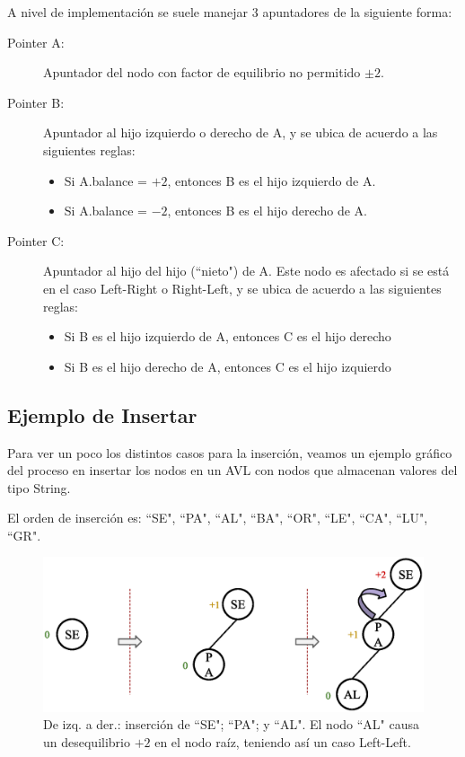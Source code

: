 A nivel de implementación se suele manejar 3 apuntadores de la siguiente forma:
\begin{description}
\item[Pointer A:] Apuntador del nodo con factor de equilibrio no permitido $\pm 2$.
\item[Pointer B:] Apuntador al hijo izquierdo o derecho de A, y se ubica de acuerdo a las siguientes reglas:
\begin{itemize}
  \item Si A.balance = $+2$, entonces B es el hijo izquierdo de A.
  \item Si A.balance = $-2$, entonces B es el hijo derecho de A.
\end{itemize}
\item[Pointer C:] Apuntador al hijo del hijo (``nieto") de A. Este nodo es afectado si se está en el caso Left-Right o Right-Left, y se ubica de acuerdo a las siguientes reglas:
\begin{itemize}
  \item Si B es el hijo izquierdo de A, entonces C es el hijo derecho
  \item Si B es el hijo derecho de A, entonces C es el hijo izquierdo
\end{itemize}
\end{description}

\subsection{Ejemplo de Insertar}

Para ver un poco los distintos casos para la inserción, veamos un ejemplo gráfico del proceso en insertar los nodos en un AVL con nodos que almacenan valores del tipo String.

El orden de inserción es: ``SE", ``PA", ``AL", ``BA", ``OR", ``LE", ``CA", ``LU", ``GR".

\begin{figure}[htpb!]
  \begin{center}
    \includegraphics[width=1.0\textwidth]{images/AVLInsertion1.eps}
  \end{center}
  \caption{De izq. a der.: inserción de ``SE"; ``PA"; y ``AL". El nodo ``AL" causa un desequilibrio $+2$ en el nodo raíz, teniendo así un caso Left-Left.}
  \label{fig:AVLInsertion1}
\end{figure}

